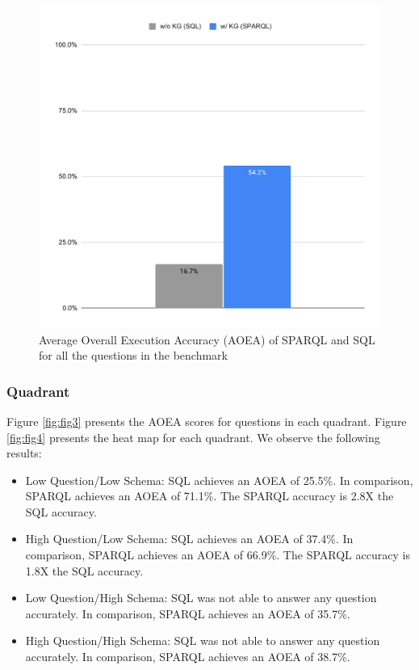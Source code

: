 \documentclass[11pt]{article}
\begin{document}
\begin{figure}
  \begin{center}
\includegraphics[scale=0.3]{submissions/Juan2024/results/overall.pdf}
\caption{Average Overall Execution Accuracy (AOEA) of SPARQL and SQL for all the questions in the benchmark}
\label{fig:fig1}
\end{center}
\vspace{-2cm}
\end{figure}

\subsubsection{Quadrant}

Figure \ref{fig:fig3} presents the AOEA scores for questions in each quadrant. 
Figure \ref{fig:fig4} presents the heat map for each quadrant.
We observe the following results: 
\begin{itemize}
    \item Low Question/Low Schema: SQL achieves an AOEA of 25.5\%. In comparison, SPARQL achieves an AOEA of 71.1\%. The SPARQL accuracy is 2.8X the SQL accuracy.

    \item High Question/Low Schema: SQL achieves an AOEA of 37.4\%. In comparison, SPARQL achieves an AOEA of 66.9\%. The SPARQL accuracy is 1.8X the SQL accuracy.

    \item Low Question/High Schema: SQL was not able to answer any question accurately. In comparison, SPARQL achieves an AOEA of 35.7\%.

    \item High Question/High Schema: SQL was not able to answer any question accurately. In comparison, SPARQL achieves an AOEA of 38.7\%.

\end{itemize}
\end{document}

